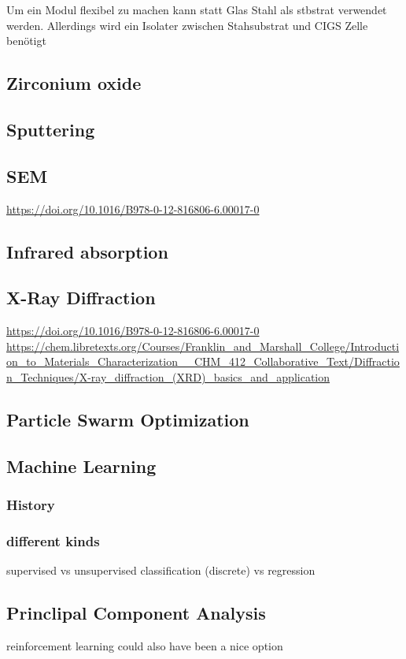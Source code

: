 Um ein Modul flexibel zu machen kann statt Glas Stahl als stbstrat verwendet werden. 
Allerdings wird ein Isolater zwischen Stahsubstrat und CIGS Zelle benötigt


\subsection{Zirconium oxide}
\subsection{Sputtering}
\subsection{SEM}
\url{https://doi.org/10.1016/B978-0-12-816806-6.00017-0}\\
\subsection{Infrared absorption}
\subsection{X-Ray Diffraction}
\url{https://doi.org/10.1016/B978-0-12-816806-6.00017-0}\\
\url{https://chem.libretexts.org/Courses/Franklin_and_Marshall_College/Introduction_to_Materials_Characterization__CHM_412_Collaborative_Text/Diffraction_Techniques/X-ray_diffraction_(XRD)_basics_and_application}\\
\subsection{Particle Swarm Optimization}
\subsection{Machine Learning}
\subsubsection{History}
\subsubsection{different kinds} 
supervised vs unsupervised
classification (discrete) vs regression
\subsection{Princlipal Component Analysis}
reinforcement learning could also have been a nice option
